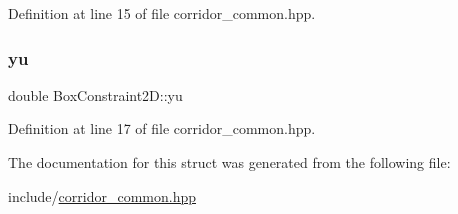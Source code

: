 Definition at line 15 of file corridor\+\_\+common.\+hpp.

\mbox{\label{struct_box_constraint2_d_a250a6cb999ee308cbfe4144afdddb803}} 
\subsubsection{\texorpdfstring{yu}{yu}}
{\footnotesize\ttfamily double Box\+Constraint2\+D\+::yu}



Definition at line 17 of file corridor\+\_\+common.\+hpp.



The documentation for this struct was generated from the following file\+:\begin{DoxyCompactItemize}
\item 
include/\hyperlink{corridor__common_8hpp}{corridor\+\_\+common.\+hpp}\end{DoxyCompactItemize}
